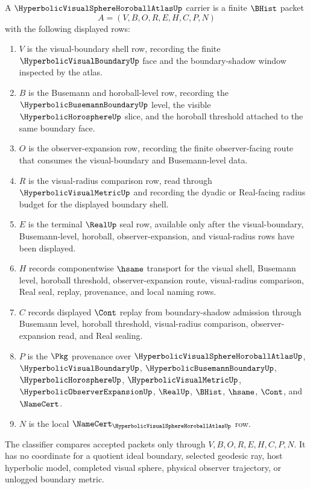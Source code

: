 \begin{definition}
\label{def:hyperbolic-visual-sphere-horoball-atlas-carrier}
A $\HyperbolicVisualSphereHoroballAtlasUp$ carrier is a finite $\BHist$ packet
$$
A=(V,B,O,R,E,H,C,P,N)
$$
with the following displayed rows:
\begin{enumerate}
\item $V$ is the visual-boundary shell row, recording the finite $\HyperbolicVisualBoundaryUp$ face and the boundary-shadow window inspected by the atlas.
\item $B$ is the Busemann and horoball-level row, recording the $\HyperbolicBusemannBoundaryUp$ level, the visible $\HyperbolicHorosphereUp$ slice, and the horoball threshold attached to the same boundary face.
\item $O$ is the observer-expansion row, recording the finite observer-facing route that consumes the visual-boundary and Busemann-level data.
\item $R$ is the visual-radius comparison row, read through $\HyperbolicVisualMetricUp$ and recording the dyadic or Real-facing radius budget for the displayed boundary shell.
\item $E$ is the terminal $\RealUp$ seal row, available only after the visual-boundary, Busemann-level, horoball, observer-expansion, and visual-radius rows have been displayed.
\item $H$ records componentwise $\hsame$ transport for the visual shell, Busemann level, horoball threshold, observer-expansion route, visual-radius comparison, Real seal, replay, provenance, and local naming rows.
\item $C$ records displayed $\Cont$ replay from boundary-shadow admission through Busemann level, horoball threshold, visual-radius comparison, observer-expansion read, and Real sealing.
\item $P$ is the $\Pkg$ provenance over $\HyperbolicVisualSphereHoroballAtlasUp$, $\HyperbolicVisualBoundaryUp$, $\HyperbolicBusemannBoundaryUp$, $\HyperbolicHorosphereUp$, $\HyperbolicVisualMetricUp$, $\HyperbolicObserverExpansionUp$, $\RealUp$, $\BHist$, $\hsame$, $\Cont$, and $\NameCert$.
\item $N$ is the local $\NameCert_{\HyperbolicVisualSphereHoroballAtlasUp}$ row.
\end{enumerate}
The classifier compares accepted packets only through $V,B,O,R,E,H,C,P,N$. It has no coordinate for a quotient ideal boundary, selected geodesic ray, host hyperbolic model, completed visual sphere, physical observer trajectory, or unlogged boundary metric.
\end{definition}

